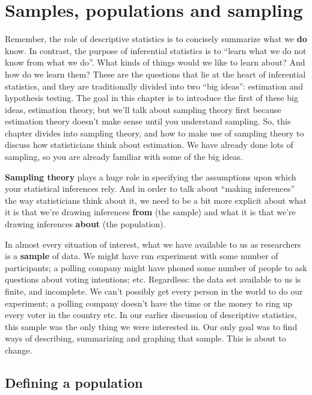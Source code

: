 \documentclass[
]{book}
\begin{document}
\hypertarget{samples-populations-and-sampling}{%
\section{Samples, populations and sampling}\label{samples-populations-and-sampling}}

Remember, the role of descriptive statistics is to concisely summarize what we \textbf{do} know. In contrast, the purpose of inferential statistics is to ``learn what we do not know from what we do''. What kinds of things would we like to learn about? And how do we learn them? These are the questions that lie at the heart of inferential statistics, and they are traditionally divided into two ``big ideas'': estimation and hypothesis testing. The goal in this chapter is to introduce the first of these big ideas, estimation theory, but we'll talk about sampling theory first because estimation theory doesn't make sense until you understand sampling. So, this chapter divides into sampling theory, and how to make use of sampling theory to discuss how statisticians think about estimation. We have already done lots of sampling, so you are already familiar with some of the big ideas.

\textbf{Sampling theory} plays a huge role in specifying the assumptions upon which your statistical inferences rely. And in order to talk about ``making inferences'' the way statisticians think about it, we need to be a bit more explicit about what it is that we're drawing inferences \textbf{from} (the sample) and what it is that we're drawing inferences \textbf{about} (the population).

In almost every situation of interest, what we have available to us as researchers is a \textbf{sample} of data. We might have run experiment with some number of participants; a polling company might have phoned some number of people to ask questions about voting intentions; etc. Regardless: the data set available to us is finite, and incomplete. We can't possibly get every person in the world to do our experiment; a polling company doesn't have the time or the money to ring up every voter in the country etc. In our earlier discussion of descriptive statistics, this sample was the only thing we were interested in. Our only goal was to find ways of describing, summarizing and graphing that sample. This is about to change.

\hypertarget{defining-a-population}{%
\subsection{Defining a population}\label{defining-a-population}}
\end{document}
